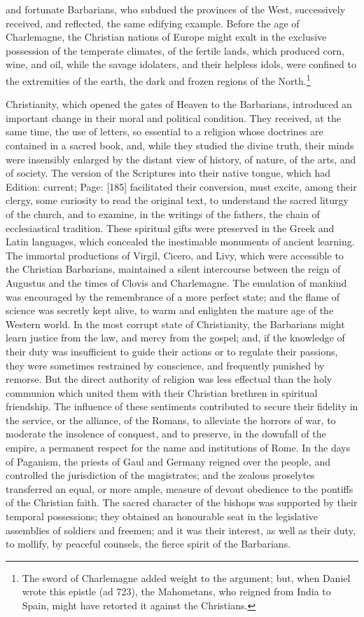 and fortunate Barbarians, who subdued the provinces of the West, successively received, and reflected, the same edifying example. Before the age of Charlemagne, the Christian nations of Europe might exult in the exclusive possession of the temperate climates, of the fertile lands, which produced corn, wine, and oil, while the savage idolaters, and their helpless idols, were confined to the extremities of the earth, the dark and frozen regions of the North.\footnote{The sword of Charlemagne added weight to the argument; but, when Daniel wrote this epistle (ad 723), the Mahometans, who reigned from India to Spain, might have retorted it against the Christians.}

Christianity, which opened the gates of Heaven to the Barbarians, introduced an important change in their moral and political condition. They received, at the same time, the use of letters, so essential to a religion whose doctrines are contained in a sacred book, and, while they studied the divine truth, their minds were insensibly enlarged by the distant view of history, of nature, of the arts, and of society. The version of the Scriptures into their native tongue, which had Edition: current; Page: [185] facilitated their conversion, must excite, among their clergy, some curiosity to read the original text, to understand the sacred liturgy of the church, and to examine, in the writings of the fathers, the chain of ecclesiastical tradition. These spiritual gifts were preserved in the Greek and Latin languages, which concealed the inestimable monuments of ancient learning. The immortal productions of Virgil, Cicero, and Livy, which were accessible to the Christian Barbarians, maintained a silent intercourse between the reign of Augustus and the times of Clovis and Charlemagne. The emulation of mankind was encouraged by the remembrance of a more perfect state; and the flame of science was secretly kept alive, to warm and enlighten the mature age of the Western world. In the most corrupt state of Christianity, the Barbarians might learn justice from the law, and mercy from the gospel; and, if the knowledge of their duty was insufficient to guide their actions or to regulate their passions, they were sometimes restrained by conscience, and frequently punished by remorse. But the direct authority of religion was less effectual than the holy communion which united them with their Christian brethren in spiritual friendship. The influence of these sentiments contributed to secure their fidelity in the service, or the alliance, of the Romans, to alleviate the horrors of war, to moderate the insolence of conquest, and to preserve, in the downfall of the empire, a permanent respect for the name and institutions of Rome. In the days of Paganism, the priests of Gaul and Germany reigned over the people, and controlled the jurisdiction of the magistrates; and the zealous proselytes transferred an equal, or more ample, measure of devout obedience to the pontiffs of the Christian faith. The sacred character of the bishops was supported by their temporal possessions; they obtained an honourable seat in the legislative assemblies of soldiers and freemen; and it was their interest, as well as their duty, to mollify, by peaceful counsels, the fierce spirit of the Barbarians. 